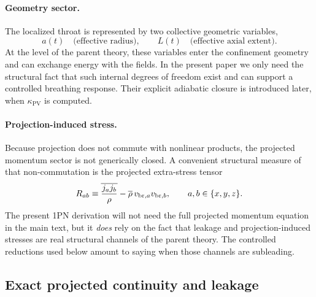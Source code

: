 \documentclass[11pt]{article}
\newcommand{\Proj}[1]{\overline{#1}}
\newcommand{\kPV}{\kappa_{\mathrm{PV}}}
\begin{document}
\paragraph{Geometry sector.}
The localized throat is represented by two collective geometric variables,
\begin{equation}
a(t)\quad\text{(effective radius)},
\qquad
L(t)\quad\text{(effective axial extent)}.
\label{eq:dictionary-geometry-dofs}
\end{equation}
At the level of the parent theory, these variables enter the confinement geometry and can
exchange energy with the fields. In the present paper we only need the structural fact
that such internal degrees of freedom exist and can support a controlled breathing
response. Their explicit adiabatic closure is introduced later, when \(\kPV\) is
computed.

\paragraph{Projection-induced stress.}
Because projection does not commute with nonlinear products, the projected momentum sector
is not generically closed. A convenient structural measure of that non-commutation is the
projected extra-stress tensor
\begin{equation}
R_{ab}
\equiv
\Proj{\frac{j_a j_b}{\rho}}
-
\Proj{\rho}\,v_{{\rm br},a}v_{{\rm br},b},
\qquad a,b\in\{x,y,z\}.
\label{eq:dictionary-extra-stress}
\end{equation}
The present 1PN derivation will not need the full projected momentum equation in the main
text, but it \emph{does} rely on the fact that leakage and projection-induced stresses are
real structural channels of the parent theory. The controlled reductions used below amount
to saying when those channels are subleading.

\subsection{Exact projected continuity and leakage}
\label{sec:dictionary-continuity}
\end{document}
